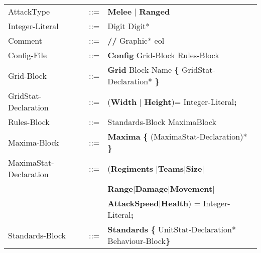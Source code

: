 \begin{center}
\begin{longtable}{ l l l }
		AttackType					&	::=	&{\bf Melee} $\mid$ {\bf Ranged} \\
		Integer-Literal				&	::=	&Digit Digit*\\
		Comment						&	::=	&{\bf //} Graphic* eol\\
		Config-File					&	::=	&{\bf Config} Grid-Block Rules-Block  		\\
		Grid-Block					&	::=	&{\bf Grid} Block-Name	 {\bf \{} GridStat-Declaration* \bf{\}} \\
		GridStat-Declaration		&	::=	&({\bf Width} $\mid$ {\bf Height})=  Integer-Literal{\bf ;} \\	
		Rules-Block					&	::=	&Standards-Block MaximaBlock 				\\
		Maxima-Block				&	::=	&{\bf Maxima} {\bf \{} (MaximaStat-Declaration)* {\bf \}}\\
		MaximaStat-Declaration	&	::=	&({\bf Regiments }$\mid${\bf Teams}$\mid${\bf Size}$\mid$\\
									&		&{\bf Range}$\mid${\bf Damage}$\mid${\bf Movement}$\mid$\\
									&		&{\bf AttackSpeed}$\mid${\bf Health}) =  Integer-Literal{\bf ;}\\
		Standards-Block				&	::=	&{\bf Standards} {\bf \{ } UnitStat-Declaration* Behaviour-Block\bf{\} }		\\
	\end{longtable}
		\end{center}					     